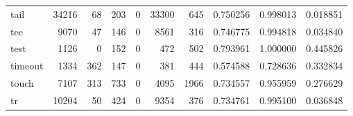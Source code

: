 \begin{longtable}{lrrrrrrrrr}
tail      &                               34216 &                                              68 &                                            203 &                                             0 &                                          33300 &                                          645 &                                           0.750256 &                               0.998013 &                             0.018851 \\
tee       &                                9070 &                                              47 &                                            146 &                                             0 &                                           8561 &                                          316 &                                           0.746775 &                               0.994818 &                             0.034840 \\
test      &                                1126 &                                               0 &                                            152 &                                             0 &                                            472 &                                          502 &                                           0.793961 &                               1.000000 &                             0.445826 \\
timeout   &                                1334 &                                             362 &                                            147 &                                             0 &                                            381 &                                          444 &                                           0.574588 &                               0.728636 &                             0.332834 \\
touch     &                                7107 &                                             313 &                                            733 &                                             0 &                                           4095 &                                         1966 &                                           0.734557 &                               0.955959 &                             0.276629 \\
tr        &                               10204 &                                              50 &                                            424 &                                             0 &                                           9354 &                                          376 &                                           0.734761 &                               0.995100 &                             0.036848 \\

\end{longtable}
